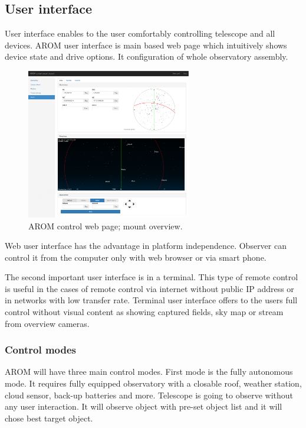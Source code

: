 \documentclass{ibws_template}
\begin{document}
\subsection{User interface}
User interface enables to the user comfortably controlling telescope and all devices. AROM user interface is main based web page which intuitively shows device state and drive options. It configuration of whole observatory assembly.

\begin{figure}[h!]
\begin{center}
\includegraphics[width=72mm]{img/arom_ui.eps}
\caption{AROM control web page; mount overview.} 
\end{center}
\end{figure}
\pagebreak

Web user interface has the advantage in platform independence. Observer can control it from the computer only with web browser or via smart phone. 

The second important user interface is in a terminal. This type of remote control is useful in the cases of remote control via internet without public IP address or in networks with low transfer rate. Terminal user interface offers to the users full control without visual content as showing captured fields, sky map or stream from overview cameras.

\subsubsection{Control modes}
AROM will have three main control modes. First mode is the fully autonomous mode. It requires fully equipped observatory with a closable roof, weather station, cloud sensor, back-up batteries and more. Telescope is going to observe without any user interaction. It will observe object with pre-set object list and it will chose best target object. 
\end{document}
